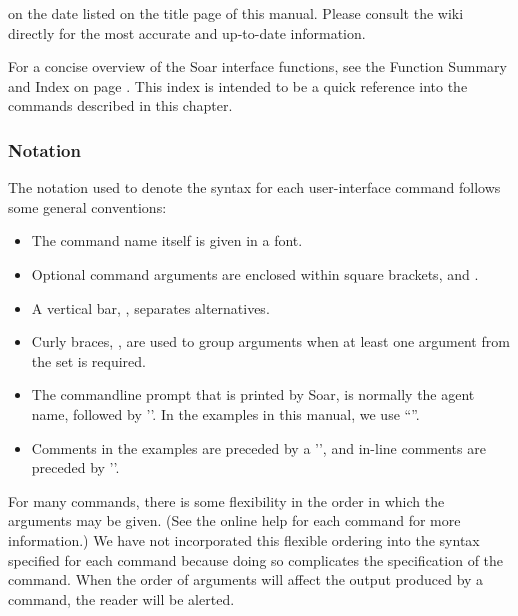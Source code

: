 \hspace{2em}


on the date listed on the title page of this manual.  Please consult
the wiki directly for the most accurate and up-to-date information.

For a concise overview of the Soar interface functions, see the Function
Summary and Index on page \pageref{func-sum}. This index is intended to be a
quick reference into the commands described in this chapter.

\subsubsection*{Notation}


The notation used to denote the syntax for each user-interface command follows
some general conventions:\vspace{-12pt}
\begin{itemize}
\item The command name itself is given in a  font.\vspace{-8pt}
\item Optional command arguments are enclosed within square brackets,
	\soar{[} and \soar{]}.\vspace{-8pt}
\item A vertical bar, \soar{|}, separates alternatives.\vspace{-8pt}
\item Curly braces, \soar{\{\}}, are used to group arguments when at least
one argument from the set is required.
\item The commandline prompt that is printed by Soar, is normally
the agent name, followed by '\soar{>}'.  In the examples in this manual, 
we use ``''.
\item Comments in the examples are preceded by
a '\soar{\#}', and in-line comments are preceded by '\soar{;\#}'.
\end{itemize}

For many commands, there is some flexibility in the order in which the
arguments may be given. (See the online help for each command for more
information.)  We have not incorporated this flexible ordering into the syntax
specified for each command because doing so complicates the specification of
the command.  When the order of arguments will affect the output
produced by a command, the reader will be alerted.

